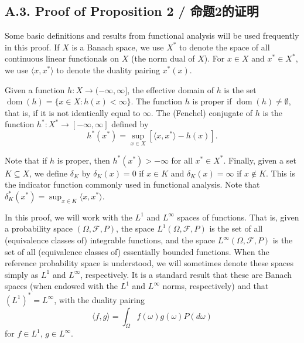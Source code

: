 \documentclass[12pt,a4paper]{article}
\newenvironment{original}
  {\par\noindent\color{black}\smallskip}
  {\par\smallskip}
\begin{document}
\subsection*{A.3. Proof of Proposition 2 / 命题2的证明}

\begin{original}
Some basic definitions and results from functional analysis will be used frequently in this proof. If $X$ is a Banach space, we use $X^*$ to denote the space of all continuous linear functionals on $X$ (the norm dual of $X$). For $x \in X$ and $x^* \in X^*$, we use $\langle x, x^* \rangle$ to denote the duality pairing $x^*(x)$.

Given a function $h: X \to (-\infty, \infty]$, the effective domain of $h$ is the set $\operatorname{dom}(h) = \{ x \in X : h(x) < \infty \}$. The function $h$ is proper if $\operatorname{dom}(h) \neq \emptyset$, that is, if it is not identically equal to $\infty$. The (Fenchel) conjugate of $h$ is the function $h^*: X^* \to [-\infty, \infty]$ defined by
\[
h^*(x^*) = \sup_{x \in X} [\langle x, x^* \rangle - h(x)].
\]

Note that if $h$ is proper, then $h^*(x^*) > -\infty$ for all $x^* \in X^*$. Finally, given a set $K \subseteq X$, we define $\delta_K$ by $\delta_K(x) = 0$ if $x \in K$ and $\delta_K(x) = \infty$ if $x \notin K$. This is the indicator function commonly used in functional analysis. Note that $\delta_K^*(x^*) = \sup_{x \in K} \langle x, x^* \rangle$.

In this proof, we will work with the $L^1$ and $L^\infty$ spaces of functions. That is, given a probability space $(\Omega, \mathcal{F}, P)$, the space $L^1(\Omega, \mathcal{F}, P)$ is the set of all (equivalence classes of) integrable functions, and the space $L^\infty(\Omega, \mathcal{F}, P)$ is the set of all (equivalence classes of) essentially bounded functions. When the reference probability space is understood, we will sometimes denote these spaces simply as $L^1$ and $L^\infty$, respectively. It is a standard result that these are Banach spaces (when endowed with the $L^1$ and $L^\infty$ norms, respectively) and that $(L^1)^* = L^\infty$, with the duality pairing
\[
\langle f, g \rangle = \int_\Omega f(\omega) g(\omega) P(d\omega)
\]
for $f \in L^1$, $g \in L^\infty$.
\end{original}
\end{document}
